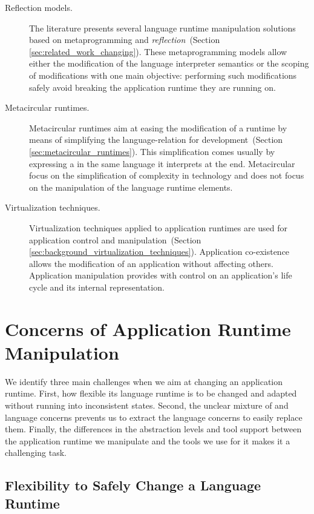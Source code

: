 \begin{description}

\item[Reflection models.] The literature presents several language runtime manipulation solutions based on metaprogramming and \emph{reflection}~(Section \ref{sec:related_work_changing}). These metaprogramming models allow either the modification of the language interpreter semantics or the scoping of modifications with one main objective: performing such modifications safely \ie avoid breaking the application runtime they are running on.

\item[Metacircular runtimes.] Metacircular runtimes aim at easing the modification of a runtime by means of simplifying the language-\VM relation for development~(Section \ref{sec:metacircular_runtimes}). This simplification comes usually by expressing a \VM in the same language it interprets at the end. Metacircular \VMs focus on the simplification of complexity in \VM technology and does not focus on the manipulation of the language runtime elements.

\item[Virtualization techniques.] Virtualization techniques applied to application runtimes are used for application control and manipulation~(Section \ref{sec:background_virtualization_techniques}). Application co-existence allows the modification of an application without affecting others. Application manipulation provides with control on an application's life cycle and its internal representation.

\end{description}

\section{Concerns of Application Runtime Manipulation} \label{sec:bootstrapping_problems}

We identify three main challenges when we aim at changing an application runtime. First, how flexible its language runtime is to be changed and adapted without running into inconsistent states. Second, the unclear mixture of \VM and language concerns prevents us to extract the language concerns to easily replace them. Finally, the differences in the abstraction levels and tool support between the application runtime we manipulate and the tools we use for it makes it a challenging task.


\subsection{Flexibility to Safely Change a Language Runtime}

